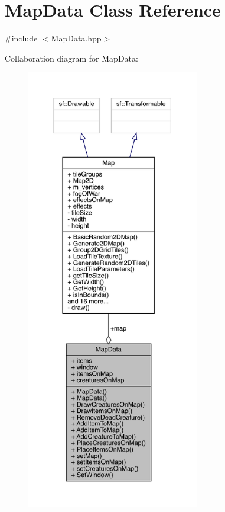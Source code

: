 \hypertarget{class_map_data}{}\section{Map\+Data Class Reference}
\label{class_map_data}


{\ttfamily \#include $<$Map\+Data.\+hpp$>$}



Collaboration diagram for Map\+Data\+:
\nopagebreak
\begin{figure}[H]
\begin{center}
\leavevmode
\includegraphics[height=550pt]{class_map_data__coll__graph}
\end{center}
\end{figure}
